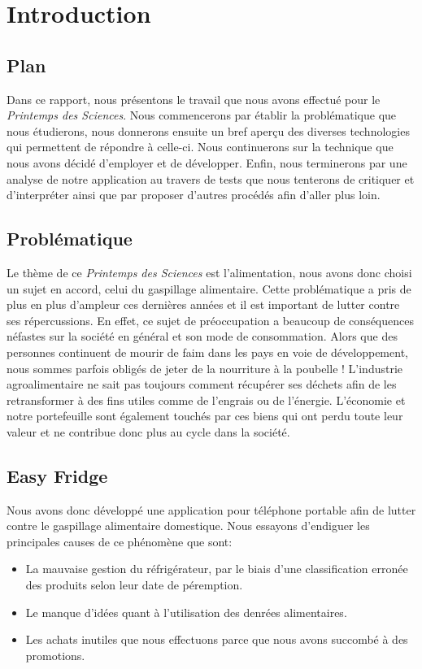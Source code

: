 \chapter{Introduction}

\section{Plan}

Dans ce rapport, nous présentons le travail que nous avons effectué pour le \textit{Printemps des Sciences}. Nous commencerons par établir la problématique que nous étudierons, nous donnerons ensuite un bref aperçu des diverses technologies qui permettent de répondre à celle-ci. Nous continuerons sur la technique que nous avons décidé d'employer et de développer. Enfin, nous terminerons par une analyse de notre application au travers de tests que nous tenterons de critiquer et d'interpréter ainsi que par proposer d'autres procédés afin d'aller plus loin.

\section{Problématique}

Le thème de ce \textit{Printemps des Sciences} est l'alimentation, nous avons donc choisi un sujet en accord, celui du gaspillage alimentaire. Cette problématique a pris de plus en plus d'ampleur ces dernières années et il est important de lutter contre ses répercussions. En effet, ce sujet de préoccupation a beaucoup de conséquences néfastes sur la société en général et son mode de consommation. Alors que des personnes continuent de mourir de faim dans les pays en voie de développement, nous sommes parfois obligés de jeter de la nourriture à la poubelle ! L'industrie agroalimentaire ne sait pas toujours comment récupérer ses déchets afin de les retransformer à des fins utiles comme de l'engrais ou de l'énergie. L'économie et notre portefeuille sont également touchés par ces biens qui ont perdu toute leur valeur et ne contribue donc plus au cycle dans la société.

\section{Easy Fridge}

Nous avons donc développé une application pour téléphone portable afin de lutter contre le gaspillage alimentaire domestique. Nous essayons d'endiguer les principales causes de ce phénomène que sont:
\begin{itemize}
    \item La mauvaise gestion du réfrigérateur, par le biais d'une classification erronée des produits selon leur date de péremption.
    \item Le manque d'idées quant à l'utilisation des denrées alimentaires.
    \item Les achats inutiles que nous effectuons parce que nous avons succombé à des promotions.
\end{itemize}

